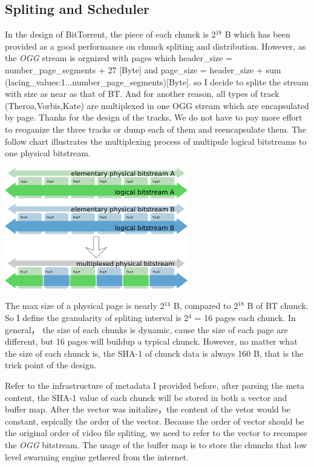 \subsection{Spliting and Scheduler}
{
In the design of BitTorrent, the piece of each chunck is 2$^{18}$ B which has been provided as a good performance on chunck spliting and distribution. 
However, as the \emph{OGG} stream is orgnized with pages which header\_size = number\_page\_segments  + 27 [Byte] and page\_size = header\_size + sum (lacing\_values:1...number\_page\_segments)[Byte].
so I decide to splite the stream with size as near as that of BT.
And for another reason, all types of track (Theroa,Vorbis,Kate) are multiplexed in one OGG stream which are encapsulated by page.
Thanks for the design of the tracks, We do not have to pay more effort to reoganize the three tracks or dump each of them and reencapsulate them.
The follow chart illustrates the multiplexing process of multipule logical bitstreams to one physical bitstream.

\begin{center}
\includegraphics[width=8cm]{data/multiplex1.png}
\end{center}

The max size of a physical page is nearly 2$^{14}$ B, compared to 2$^{18}$ B of BT chunck.
So I define the granularity of spliting interval is 2$^{4}$ = 16 pages each chunck.
In general， the size of each chunks is dynamic, cause the size of each page are different, but 16 pages will buildup a typical chunck. However, no matter what the size of each chunck is, the SHA-1 of chunck data is always 160 B, that is the trick point of the design.

Refer to the infrastructure of metadata I provided before, after parsing the meta content, the SHA-1 value of each chunck will be stored in both a vector and buffer map.
After the vector was initalize，the content of the vetor would be constant, espically the order of the vector.
Because the order of vector should be the original order of video file spliting, we need to refer to the vector to recompse the \emph{OGG} bitstream.
The usage of the buffer map is to store the chuncks that low level swarming engine gethered from the internet.

}

